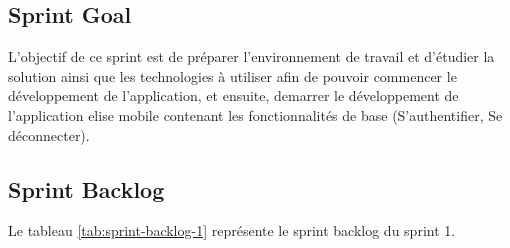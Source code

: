 \subsection{Sprint Goal}
L'objectif de ce sprint est de préparer l'environnement de travail et d'étudier la solution ainsi que les technologies à utiliser afin de pouvoir commencer le développement de l'application, et ensuite, demarrer le développement de l'application elise mobile contenant les fonctionnalités de base (S'authentifier, Se déconnecter).

\subsection{Sprint Backlog}

Le tableau \ref{tab:sprint-backlog-1} représente le sprint backlog du sprint 1.

